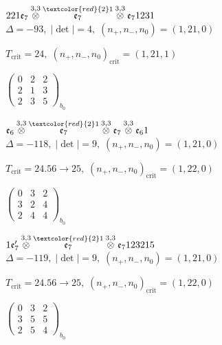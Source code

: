 \documentclass[10pt]{article}
\begin{document}
\smallskip

$221\mathfrak{e}_7\overset{3,3}{\otimes}\overset{\textcolor{red}{2}1}{\mathfrak{e}_7}\overset{3,3}{\otimes}\mathfrak{e}_71231$ \quad $\Delta=-93,\; |\det|=4,\; (n_+,n_-,n_0)=(1,21,0)$

\hspace{1em}$T_{\text{crit}}=24,\; (n_+,n_-,n_0)_{\text{crit}}=(1,21,1)$

\hspace{2em}$\left(\begin{smallmatrix}0 & 2 & 2 \\ 2 & 1 & 3 \\ 2 & 3 & 5\end{smallmatrix}\right)_{\!b_0}$

\smallskip

$\mathfrak{e}_6\overset{3,3}{\otimes}\overset{\textcolor{red}{2}1}{\mathfrak{e}_7}\overset{3,3}{\otimes}\mathfrak{e}_7\overset{3,3}{\otimes}\mathfrak{e}_61$ \quad $\Delta=-118,\; |\det|=9,\; (n_+,n_-,n_0)=(1,21,0)$

\hspace{1em}$T_{\text{crit}}=24.56 \to 25,\; (n_+,n_-,n_0)_{\text{crit}}=(1,22,0)$

\hspace{2em}$\left(\begin{smallmatrix}0 & 3 & 2 \\ 3 & 2 & 4 \\ 2 & 4 & 4\end{smallmatrix}\right)_{\!b_0}$

\smallskip

$1\mathfrak{e}_7'\overset{3,3}{\otimes}\overset{\textcolor{red}{2}1}{\mathfrak{e}_7}\overset{3,3}{\otimes}\mathfrak{e}_7123215$ \quad $\Delta=-119,\; |\det|=9,\; (n_+,n_-,n_0)=(1,21,0)$

\hspace{1em}$T_{\text{crit}}=24.56 \to 25,\; (n_+,n_-,n_0)_{\text{crit}}=(1,22,0)$

\hspace{2em}$\left(\begin{smallmatrix}0 & 3 & 2 \\ 3 & 5 & 5 \\ 2 & 5 & 4\end{smallmatrix}\right)_{\!b_0}$
\end{document}

